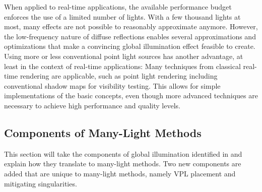 When applied to real-time applications, the available performance budget enforces the use of a limited number of lights. With a few thousand lights at most, many effects are not possible to reasonably approximate anymore. However, the low-frequency nature of diffuse reflections enables several approximations and optimizations that make a convincing global illumination effect feasible to create. Using more or less conventional point light sources has another advantage, at least in the context of real-time applications: Many techniques from classical real-time rendering are applicable, such as point light rendering including conventional shadow maps for visibility testing. This allows for simple implementations of the basic concepts, even though more advanced techniques are necessary to achieve high performance and quality levels.



\subsection{Components of Many-Light Methods}
This section will take the components of global illumination identified in  and explain how they translate to many-light methods. Two new components are added that are unique to many-light methods, namely VPL placement and mitigating singularities.

